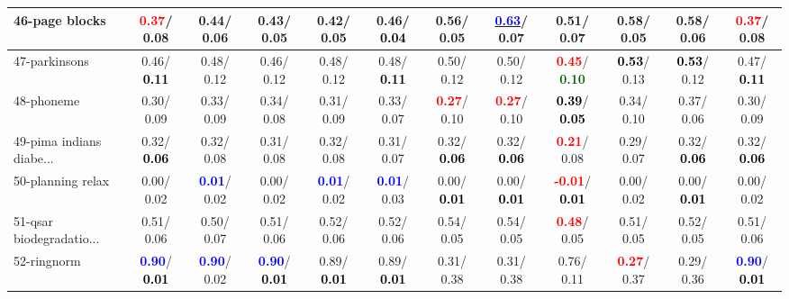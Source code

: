 \begin{table}[h]
\begin{center}
{\begin{tabular}{lc|c|c|c|c|c|c|c|c|c|c}
46-page blocks & \textcolor{red}{\textbf{  0.37}}/  0.08 &   0.44/  0.06 &   0.43/  0.05 &   0.42/  0.05 &   0.46/\textcolor{black}{\textbf{  0.04}} &   0.56/  0.05 & \underline{\textcolor{blue}{\textbf{  0.63}}}/  0.07 &   0.51/  0.07 &   0.58/  0.05 &   0.58/  0.06 & \textcolor{red}{\textbf{  0.37}}/  0.08 \\ \hline
47-parkinsons &   0.46/\textcolor{black}{\textbf{  0.11}} &   0.48/  0.12 &   0.46/  0.12 &   0.48/  0.12 &   0.48/\textcolor{black}{\textbf{  0.11}} &   0.50/  0.12 &   0.50/  0.12 & \textcolor{red}{\textbf{  0.45}}/\textcolor{darkgreen}{\textbf{  0.10}} & \textcolor{black}{\textbf{  0.53}}/  0.13 & \textcolor{black}{\textbf{  0.53}}/  0.12 &   0.47/\textcolor{black}{\textbf{  0.11}} \\
48-phoneme &   0.30/  0.09 &   0.33/  0.09 &   0.34/  0.08 &   0.31/  0.09 &   0.33/  0.07 & \textcolor{red}{\textbf{  0.27}}/  0.10 & \textcolor{red}{\textbf{  0.27}}/  0.10 & \textcolor{black}{\textbf{  0.39}}/\textcolor{black}{\textbf{  0.05}} &   0.34/  0.10 &   0.37/  0.06 &   0.30/  0.09 \\
49-pima indians diabe... &   0.32/\textcolor{black}{\textbf{  0.06}} &   0.32/  0.08 &   0.31/  0.08 &   0.32/  0.08 &   0.31/  0.07 &   0.32/\textcolor{black}{\textbf{  0.06}} &   0.32/\textcolor{black}{\textbf{  0.06}} & \textcolor{red}{\textbf{  0.21}}/  0.08 &   0.29/  0.07 &   0.32/\textcolor{black}{\textbf{  0.06}} &   0.32/\textcolor{black}{\textbf{  0.06}} \\
50-planning relax &   0.00/  0.02 & \textcolor{blue}{\textbf{  0.01}}/  0.02 &   0.00/  0.02 & \textcolor{blue}{\textbf{  0.01}}/  0.02 & \textcolor{blue}{\textbf{  0.01}}/  0.03 &   0.00/\textcolor{black}{\textbf{  0.01}} &   0.00/\textcolor{black}{\textbf{  0.01}} & \textcolor{red}{\textbf{ -0.01}}/\textcolor{black}{\textbf{  0.01}} &   0.00/  0.02 &   0.00/\textcolor{black}{\textbf{  0.01}} &   0.00/  0.02 \\
51-qsar biodegradatio... &   0.51/  0.06 &   0.50/  0.07 &   0.51/  0.06 &   0.52/  0.06 &   0.52/  0.06 &   0.54/  0.05 &   0.54/  0.05 & \textcolor{red}{\textbf{  0.48}}/  0.05 &   0.51/  0.05 &   0.52/  0.05 &   0.51/  0.06 \\
52-ringnorm & \textcolor{blue}{\textbf{  0.90}}/\textcolor{black}{\textbf{  0.01}} & \textcolor{blue}{\textbf{  0.90}}/  0.02 & \textcolor{blue}{\textbf{  0.90}}/\textcolor{black}{\textbf{  0.01}} &   0.89/\textcolor{black}{\textbf{  0.01}} &   0.89/\textcolor{black}{\textbf{  0.01}} &   0.31/  0.38 &   0.31/  0.38 &   0.76/  0.11 & \textcolor{red}{\textbf{  0.27}}/  0.37 &   0.29/  0.36 & \textcolor{blue}{\textbf{  0.90}}/\textcolor{black}{\textbf{  0.01}} \\

\end{tabular}}
\end{center}
\end{table}
